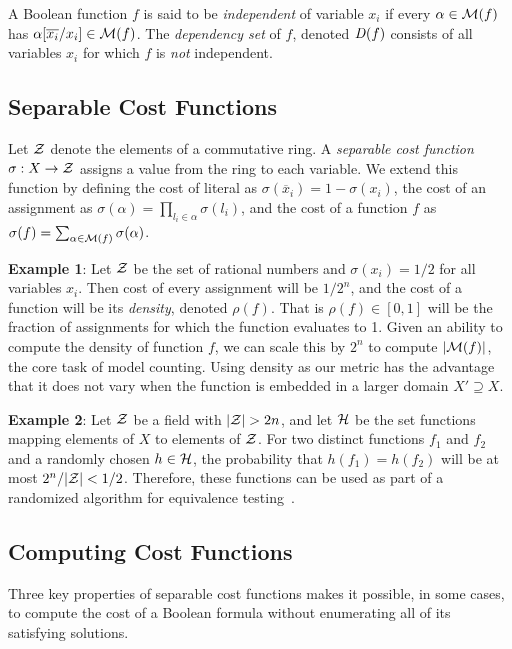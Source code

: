 \documentclass{llncs}
\newcommand{\obar}[1]{\overline{#1}}
\newcommand{\interp}{\alpha}
\newcommand{\interpset}[1]{{\cal M}(#1)}
\newcommand{\ring}{{\cal Z}}
\newcommand{\cost}{\sigma}
\newcommand{\density}{\rho}
\newcommand{\hashset}{{\cal H}}
\newcommand{\fhash}{h}
\newcommand{\depend}{{\it D}}
\newcommand{\subs}[2]{[#2/#1]}
\newcommand{\subsflip}[1]{\subs{#1}{\obar{#1}}}
\begin{document}
A Boolean function $f$ is said to be {\em independent} of variable
$x_i$ if every $\interp \in \interpset{f}$ has $\interp\subsflip{x_i}
\in \interpset{f}$.  The {\em dependency set} of $f$, denoted
$\depend(f)$ consists of all variables $x_i$ for which $f$ is {\em
  not} independent.

\subsection{Separable Cost Functions}

Let $\ring$ denote the elements of a commutative ring.  A {\em
  separable cost function} $\cost:X \rightarrow \ring$ assigns a value
from the ring to each variable.  We extend this function by defining
the cost of literal as $\cost(\obar{x}_i) = 1 - \cost(x_i)$, the cost
of an assignment as $\cost(\interp) = \prod_{l_i \in \interp}
\cost(l_i)$, and the cost of a function $f$ as $\cost(f) =
\sum_{\interp \in \interpset{f}} \cost(\interp)$.

{\bf Example 1}: Let $\ring$ be the set of rational numbers and
$\cost(x_i) = 1/2$ for all variables $x_i$.  Then cost of every
assignment will be $1/2^{n}$, and the cost of a function will be its
{\em density}, denoted $\density(f)$.  That is $\density(f) \in [0,
  1]$ will be the fraction of assignments for which the function
evaluates to 1.  Given an ability to compute the density of
function $f$, we can scale this by $2^n$ to compute $|\interpset{f}|$, the core task of model counting.
Using density as our metric has the advantage that it
does not vary when the function is embedded in a larger domain $X'
\supseteq X$.

{\bf Example 2}: Let $\ring$ be a field with $|\ring| > 2n$,
and let $\hashset$ be the set functions
mapping elements of $X$ to elements of $\ring$.  For
two distinct functions $f_1$ and $f_2$ and a randomly chosen $\fhash
\in \hashset$, the probability that $h(f_1) = h(f_2)$ will be at most
$2^n/|\ring|< 1/2$.  Therefore, these functions can be used as part of a
randomized algorithm for equivalence testing~\cite{blum:ipl:1980}.

\subsection{Computing Cost Functions}

Three key properties of separable cost functions makes it
possible, in some cases, to compute the cost of a Boolean formula without enumerating all of its satisfying solutions.
\end{document}
